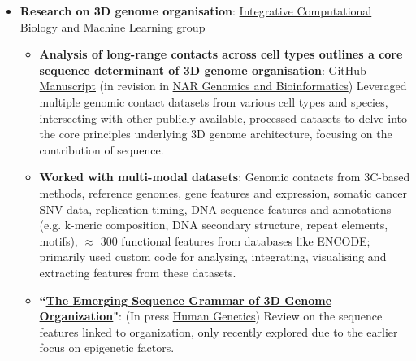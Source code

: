 \documentclass{article}
\newcommand{\resumeItem}[2]{
  \item\small{
    \textbf{#1}{: #2 \vspace{-2pt}}
  }
}
\newcommand{\resumeItemListStart}{\begin{itemize}}
\newcommand{\resumeItemListEnd}{\end{itemize}\vspace{-5pt}}
\begin{document}
            \resumeItemListStart
                \resumeItem{Research on 3D genome organisation}{\href{https://github.com/SahakyanLab}{Integrative Computational Biology and Machine Learning} group}
                    \begin{itemize}
                        \resumeItem{Analysis of long-range contacts across cell types outlines a core sequence determinant of 3D genome organisation}{\href{https://github.com/SahakyanLab/GenomicContactDynamics}{GitHub} \href{https://www.biorxiv.org/content/10.1101/2025.03.16.643527v1}{Manuscript} (in revision in \href{https://academic.oup.com/nargab}{NAR Genomics and Bioinformatics}) Leveraged multiple genomic contact datasets from various cell types and species, intersecting with other publicly available, processed datasets to delve into the core principles underlying 3D genome architecture, focusing on the contribution of sequence.}
                        \resumeItem{Worked with multi-modal datasets}{Genomic contacts from 3C-based methods, reference genomes, gene features and expression, somatic cancer SNV data, replication timing, DNA sequence features and annotations (e.g. k-meric composition, DNA secondary structure, repeat elements, motifs), $\approx$ 300 functional features from databases like ENCODE; primarily used custom code for analysing, integrating, visualising and extracting features from these datasets.}
                        \resumeItem{``\href{https://doi.org/10.31219/osf.io/3xs57_v1}{The Emerging Sequence Grammar of 3D Genome Organization}"}{{(In press \href{https://link.springer.com/journal/439}{Human Genetics}}) Review on the sequence features linked to organization, only recently explored due to the earlier focus on epigenetic factors.}
                    \end{itemize}
            \resumeItemListEnd
\end{document}
